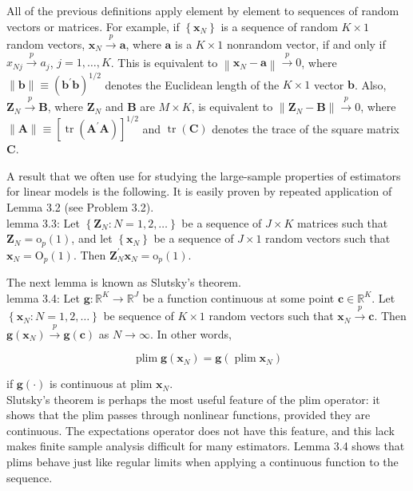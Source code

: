 \documentclass[10pt]{article}
\begin{document}
All of the previous definitions apply element by element to sequences of random vectors or matrices. For example, if $\left\{\mathbf{x}_{N}\right\}$ is a sequence of random $K \times 1$ random vectors, $\mathbf{x}_{N} \xrightarrow{p} \mathbf{a}$, where $\mathbf{a}$ is a $K \times 1$ nonrandom vector, if and only if $x_{N j} \xrightarrow{p} a_{j}$, $j=1, \ldots, K$. This is equivalent to $\left\|\mathbf{x}_{N}-\mathbf{a}\right\| \xrightarrow{p} 0$, where $\|\mathbf{b}\| \equiv\left(\mathbf{b}^{\prime} \mathbf{b}\right)^{1 / 2}$ denotes the Euclidean length of the $K \times 1$ vector $\mathbf{b}$. Also, $\mathbf{Z}_{N} \xrightarrow{p} \mathbf{B}$, where $\mathbf{Z}_{N}$ and $\mathbf{B}$ are $M \times K$, is equivalent to $\left\|\mathbf{Z}_{N}-\mathbf{B}\right\| \xrightarrow{p} 0$, where $\|\mathbf{A}\| \equiv\left[\operatorname{tr}\left(\mathbf{A}^{\prime} \mathbf{A}\right)\right]^{1 / 2}$ and $\operatorname{tr}(\mathbf{C})$ denotes the trace of the square matrix $\mathbf{C}$.

A result that we often use for studying the large-sample properties of estimators for linear models is the following. It is easily proven by repeated application of Lemma 3.2 (see Problem 3.2).\\
lemma 3.3: Let $\left\{\mathbf{Z}_{N}: N=1,2, \ldots\right\}$ be a sequence of $J \times K$ matrices such that $\mathbf{Z}_{N}= \mathrm{o}_{p}(1)$, and let $\left\{\mathbf{x}_{N}\right\}$ be a sequence of $J \times 1$ random vectors such that $\mathbf{x}_{N}=\mathrm{O}_{p}(1)$. Then $\mathbf{Z}_{N}^{\prime} \mathbf{x}_{N}=\mathrm{o}_{p}(1)$.

The next lemma is known as Slutsky's theorem.\\
lemma 3.4: Let $\mathbf{g}: \mathbb{R}^{K} \rightarrow \mathbb{R}^{J}$ be a function continuous at some point $\mathbf{c} \in \mathbb{R}^{K}$. Let $\left\{\mathbf{x}_{N}: N=1,2, \ldots\right\}$ be sequence of $K \times 1$ random vectors such that $\mathbf{x}_{N} \xrightarrow{p} \mathbf{c}$. Then $\mathbf{g}\left(\mathbf{x}_{N}\right) \xrightarrow{p} \mathbf{g}(\mathbf{c})$ as $N \rightarrow \infty$. In other words,


\begin{equation*}
\operatorname{plim} \mathbf{g}\left(\mathbf{x}_{N}\right)=\mathbf{g}\left(\operatorname{plim} \mathbf{x}_{N}\right) \tag{3.1}
\end{equation*}


if $\mathbf{g}(\cdot)$ is continuous at plim $\mathbf{x}_{N}$.\\
Slutsky's theorem is perhaps the most useful feature of the plim operator: it shows that the plim passes through nonlinear functions, provided they are continuous. The expectations operator does not have this feature, and this lack makes finite sample analysis difficult for many estimators. Lemma 3.4 shows that plims behave just like regular limits when applying a continuous function to the sequence.
\end{document}
